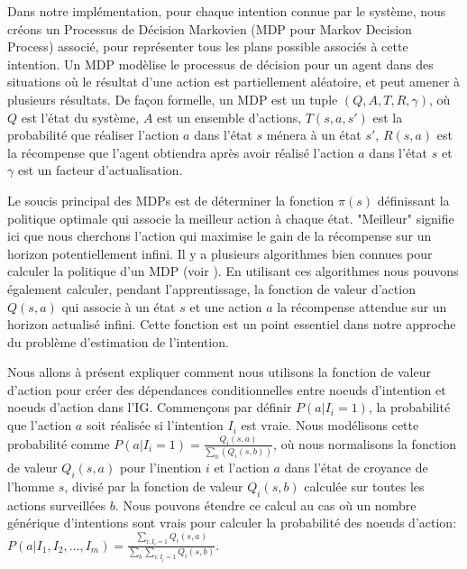 \documentclass[a4paper,11pt,twoside]{StyleThese}
\begin{document}
Dans notre implémentation, pour chaque intention connue par le système, nous créons un Processus de Décision Markovien (MDP pour Markov Decision Process) associé, pour représenter tous les plans possible associés à cette intention. Un MDP modèlise le processus de décision pour un agent dans des situations où le résultat d'une action est partiellement aléatoire, et peut amener à plusieurs résultats. De façon formelle, un MDP est un tuple  \((Q,A,T,R,\gamma)\), où $Q$ est l'état du système, $A$ est un ensemble d'actions, $T(s,a,s')$ est la probabilité que réaliser l'action $a$ dans l'état $s$ ménera à un état $s'$, $R(s,a)$ est la récompense que l'agent obtiendra après avoir réalisé l'action $a$ dans l'état $s$ et \(\gamma\) est un facteur d'actualisation.


Le soucis principal des MDPs est de déterminer la fonction \(\pi(s)\) définissant la politique  optimale qui associe la meilleur action à chaque état. "Meilleur" signifie ici que nous cherchons l'action qui maximise le gain de la récompense sur un horizon potentiellement infini. Il y a plusieurs algorithmes bien connues pour calculer la politique d'un MDP (voir \cite{2012Mausam}). En utilisant ces algorithmes nous pouvons également calculer, pendant l'apprentissage, la fonction de valeur d'action \(Q(s,a)\) qui associe à un état $s$ et une action $a$ la récompense attendue sur un horizon actualisé infini. Cette fonction est un point essentiel dans notre approche du problème d'estimation de l'intention.



Nous allons à présent expliquer comment nous utilisons la fonction de valeur d'action pour créer des dépendances conditionnelles entre noeuds d'intention et noeuds d'action dans l'IG. Commençons par définir \(P(a|I_i=1)\), la probabilité que l'action $a$ soit réalisée si l'intention $I_i$ est vraie. Nous modélisons cette probabilité comme \(P(a|I_i=1)=\frac{Q_i(s,a)}{\sum_b(Q_i(s,b))}\), où nous normalisons la fonction de valeur $Q_i(s,a)$ pour l'inention $i$ et l'action $a$ dans l'état de croyance de l'homme $s$, divisé par la fonction de valeur $Q_i(s,b)$ calculée sur toutes les actions surveillées $b$. Nous pouvons étendre ce calcul au cas où un nombre générique d'intentions sont vrais pour calculer la probabilité des noeuds d'action: \(P(a|I_1,I_2,...,I_m)=\frac{\sum_{i:I_i=1}Q_i(s,a)}{\sum_b\sum_{i:I_i=1}Q_i(s,b)}\).
\end{document}
